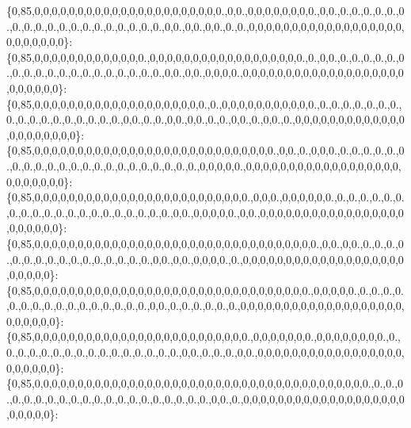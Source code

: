 \{0,85,0,0,0,0,0,0,0,0,0,0,0,0,0,0,0,0,0,0,0,0,0,0.,0,0.,0,0,0,0,0,0,0,0.,0,0.,0.,0.,0.,0.,0.,0.,0.,0.,0.,0.,0.,0.,0.,0.,0.,0.,0.,0.,0.,0,0.,0,0.,0,0.,0.,0.,0,0,0,0,0,0,0,0,0,0,0,0,0,0,0,0,0,0,0,0,0,0,0,0,0\}\+: \{0,85,0,0,0,0,0,0,0,0,0,0,0,0,0.,0,0,0,0,0,0,0,0,0,0,0,0,0,0,0,0,0,0.,0.,0,0.,0.,0.,0.,0.,0.,0.,0.,0.,0.,0.,0.,0.,0.,0.,0.,0.,0.,0.,0.,0,0.,0,0.,0,0,0,0.,0,0,0,0,0,0,0,0,0,0,0,0,0,0,0,0,0,0,0,0,0,0,0,0,0\}\+: \{0,85,0,0,0,0,0,0,0,0,0,0,0,0,0,0,0,0,0,0,0,0.,0.,0,0,0,0,0,0,0,0,0,0,0.,0.,0.,0.,0.,0.,0.,0.,0.,0.,0.,0.,0.,0.,0.,0.,0.,0.,0,0.,0.,0.,0,0.,0,0.,0.,0.,0,0.,0.,0,0.,0.,0,0,0,0,0,0,0,0,0,0,0,0,0,0,0,0,0,0,0,0,0\}\+: \{0,85,0,0,0,0,0,0,0,0,0,0,0,0,0,0,0,0,0,0,0,0,0,0,0,0,0,0,0,0.,0,0.,0.,0,0,0.,0.,0.,0.,0.,0.,0.,0.,0.,0.,0.,0.,0.,0.,0.,0.,0.,0.,0.,0.,0.,0.,0.,0,0,0,0,0.,0,0,0,0,0,0,0,0,0,0,0,0,0,0,0,0,0,0,0,0,0,0,0,0,0\}\+: \{0,85,0,0,0,0,0,0,0,0,0,0,0,0,0,0,0,0,0,0,0,0,0,0,0,0,0.,0,0,0.,0,0,0,0,0,0.,0.,0.,0.,0.,0.,0.,0.,0.,0.,0.,0.,0.,0.,0.,0.,0.,0.,0.,0.,0.,0,0.,0,0,0,0,0.,0,0.,0,0,0,0,0,0,0,0,0,0,0,0,0,0,0,0,0,0,0,0,0,0,0\}\+: \{0,85,0,0,0,0,0,0,0,0,0,0,0,0,0,0,0,0,0,0,0,0,0,0,0,0,0,0,0,0,0,0,0,0,0.,0,0.,0,0.,0.,0.,0.,0.,0.,0.,0.,0.,0.,0.,0.,0.,0.,0.,0.,0.,0,0.,0,0.,0,0,0,0.,0.,0,0,0,0,0,0,0,0,0,0,0,0,0,0,0,0,0,0,0,0,0,0,0,0\}\+: \{0,85,0,0,0,0,0,0,0,0,0,0,0,0,0,0,0,0,0,0,0,0,0,0,0,0,0,0,0,0,0,0,0,0.,0,0,0,0,0.,0.,0.,0.,0.,0.,0.,0.,0.,0.,0.,0.,0.,0.,0.,0.,0.,0,0.,0.,0.,0.,0.,0.,0.,0,0,0,0,0,0,0,0,0,0,0,0,0,0,0,0,0,0,0,0,0,0,0,0,0\}\+: \{0,85,0,0,0,0,0,0,0,0,0,0,0,0,0,0,0,0,0,0,0,0,0,0,0,0,0.,0,0,0,0,0,0,0.,0,0,0,0,0,0,0,0.,0.,0.,0.,0.,0.,0.,0.,0.,0.,0.,0.,0.,0.,0.,0.,0.,0,0.,0.,0.,0.,0,0.,0,0,0,0,0,0,0,0,0,0,0,0,0,0,0,0,0,0,0,0,0,0,0\}\+: \{0,85,0,0,0,0,0,0,0,0,0,0,0,0,0,0,0,0,0,0,0,0,0,0,0,0,0,0,0,0,0,0,0,0,0,0,0,0,0,0,0.,0.,0.,0.,0.,0.,0.,0.,0.,0.,0.,0.,0.,0.,0.,0.,0.,0.,0.,0.,0.,0,0.,0.,0,0,0,0,0,0,0,0,0,0,0,0,0,0,0,0,0,0,0,0,0,0,0,0\}\+: 